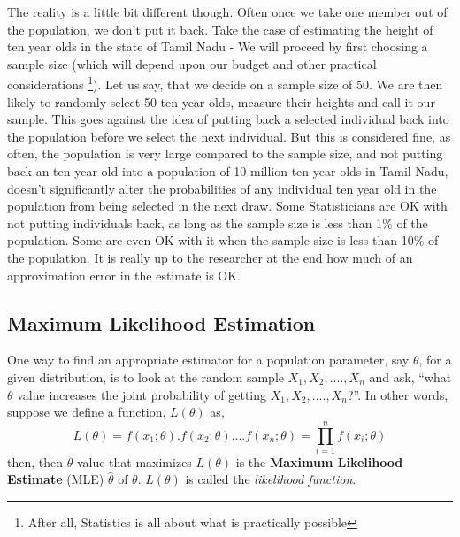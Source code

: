 The reality is a little bit different though. Often once we take one member out of the population, we don't put it back. Take the case of estimating the height of ten year olds in the state of Tamil Nadu - We will proceed by first choosing a sample size (which will depend upon our budget and other practical considerations \footnote{After all, Statistics is all about what is practically possible}). Let us say, that we decide on a sample size of 50. We are then likely to randomly select 50 ten year olds, measure their heights and call it our sample. This goes against the idea of putting back a selected individual back into the population before we select the next individual. But this is considered fine, as often, the population is very large compared to the sample size, and not putting back an ten year old into a population of 10 million ten year olds in Tamil Nadu, doesn't significantly alter the probabilities of any individual ten year old in the population from being selected in the next draw. Some Statisticians are OK with not putting individuals back, as long as the sample size is less than 1\% of the population. Some are even OK with it when the sample size is less than 10\% of the population. It is really up to the researcher at the end how much of an approximation error in the estimate is OK. 

\subsection{Maximum Likelihood Estimation}
One way to find an appropriate estimator for a population parameter, say $\theta$, for a given distribution, is to look at the random sample $X_1, X_2,...., X_n$ and ask, ``what $\theta$ value increases the joint probability of getting $X_1, X_2, ...., X_n$?''. In other words, suppose we define a function, $L(\theta)$ as,
	\[ L(\theta) = f(x_1;\theta).f(x_2;\theta)....f(x_n;\theta) = \prod_{i=1}^{n} f(x_i;\theta) \]
then, then $\theta$ value that maximizes $L(\theta)$ is the \textbf{Maximum Likelihood Estimate} (MLE) $\hat{\theta}$ of $\theta$. $L(\theta)$ is called the \emph{likelihood function}.

